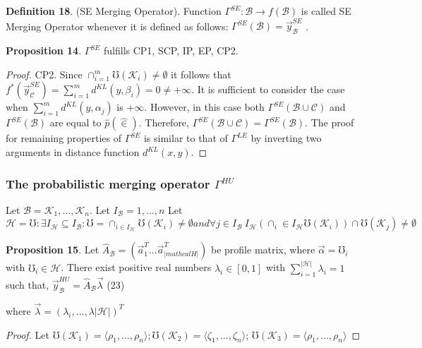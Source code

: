 \documentclass[]{iosart2c}
\begin{document}
    \textbf{Definition 18}. (SE Merging Operator). Function
    $\Gamma^{SE} : \mathcal{B} \to f(\mathcal{B})$ is called SE Merging Operator
    whenever it is defined as follows:
    $\Gamma^{SE}(\mathcal{B}) = \vec{y}^{SE}_\mathcal{B}$ .

    \textbf{Proposition 14}.
    $\Gamma^{SE}$ fulfills CP1, SCP, IP, EP, CP2.

    \begin{proof}
        CP2. Since $\cap^m_{i=1}\mho(\mathcal{K}_i) \neq \emptyset$ it follows that
        $f^*(\vec{y}^{SE}_\mathcal{C} ) = \sum^m_{i=1} d^{KL}(y, \beta_i) = 0 \neq +\infty$. It is sufficient
        to consider the case when $\sum^m_{i=1} d^{KL}(y, \alpha_j)$
        is $+\infty$. However, in this case both $\Gamma^{SE}(\mathcal{B} \cup \mathcal{C})$ and
        $\Gamma^{SE}(\mathcal{B})$ are equal to $\hat{p}(\hat{\in})$. Therefore, $\Gamma^{SE}(\mathcal{B} \cup \mathcal{C}) =
        \Gamma^{SE}(\mathcal{B})$. The proof for remaining properties of $\Gamma^{SE}$
        is similar to that of $\Gamma^{LE}$ by inverting two arguments
        in distance function $d^{KL}(x, y)$.
    \end{proof}

    \subsubsection{The probabilistic merging operator $\Gamma^{HU}$}

    Let  $\mathcal{B} = {\mathcal{K}_1, ...,\mathcal{K}_n}$. Let $I_\mathcal{B} = {1, ..., n} $
    Let $\mathcal{H} = { \mho : \exists I_\mathcal{H} \subseteq I_\mathcal{B} : \mho = \cap_{i \in I_\mathcal{H}} \mho(\mathcal{K}_i) \neq \emptyset and \forall j \in I_\mathcal{B} \ I_\mathcal{H}(\cap_i\in I_\mathcal{H} \mho(\mathcal{K}_i)) \cap \mho(\mathcal{K}_j) \neq \emptyset }$

    \textbf{Proposition 15}. Let $\hat{A}_\mathcal{B} = (\vec{a}^T_1 ...\vec{a}^T_|mathcal{H}|)$ be profile
    matrix, where $\vec{\alpha} = \mho_i$ with $\mho_i \in \mathcal{H}$. There exist positive
    real numbers $\lambda_i \in [0, 1]$ with $\sum^{|\mathcal{H}|}_{i=1} \lambda_i = 1$ such
    that,
    $\vec{y}^{HU}_\mathcal{B} = \hat{A}_\mathcal{B}\vec{\lambda}$ (23)

    where $\vec{\lambda} = (\lambda_i, ..., \lambda|\mathcal{H}|)^T$

    \begin{proof}
        Let $\mho(\mathcal{K}_1)=\langle \rho_1, ..., \rho_n \rangle;\mho(\mathcal{K}_2)=\langle\zeta_1, ..., \zeta_n \rangle$;
        $\mho(\mathcal{K}_3) = \langle\rho_1, ..., \rho_n\rangle$
    \end{proof}
\end{document}
